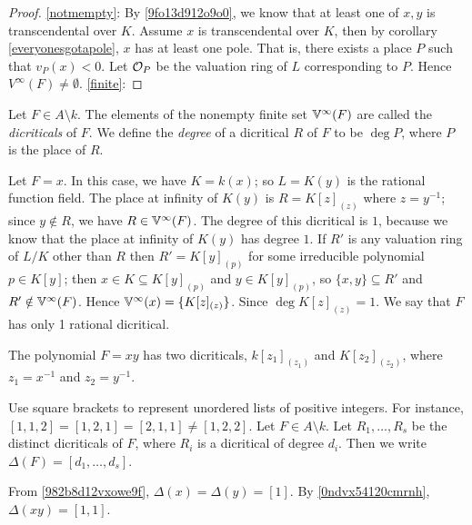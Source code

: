 \begin{proof}
	\eqref{notmempty}: By \ref{9fo13d912o9o0}, 
	we know that at least one of $x,y$ is transcendental 
	over $K$. Assume $x$ is transcendental over $K$, then by 
	corollary \ref{everyonesgotapole}, $x$ has at least one pole. 
	That is, there exists 
	a place $P$ such that $v_P(x)<0$. Let $\mathcal{O}_P$ be 
	the valuation ring of $L$ corresponding to $P$. Hence $V^{\infty}(F) \neq \emptyset$. 
	\eqref{finite}:
\end{proof}

\begin{definition}
	Let $F \in A \setminus  k$.
	The elements of the nonempty finite set $\mathbb{V}^\infty(F)$ are called the {\it dicriticals\/} of $F$.
	We define the {\it degree\/} of a dicritical $R$ of $F$ to be $\deg P$, where
	$P$ is the place of $R$.
\end{definition}

\begin{example} \label {982b8d12vxowe9f}
	Let $F=x$. In this case, we have $K= k(x)$; 
	so $L=K(y)$ is the rational function field.
	The place at infinity of $K(y)$ is $R = K[ z ]_{(z)}$ where $z = y^{-1}$;
	since $y \notin R$, we have $R \in \mathbb{V}^\infty(F)$.  
	The degree of this dicritical is $1$,
	because we know that the place at infinity of $K(y)$ has degree $1$.
	If $R'$ is any valuation ring of $L/K$ other than $R$
	then $R' = K[y]_{(p)}$ for some irreducible polynomial $p \in K[y]$;
	then $x \in K \subseteq K[y]_{(p)}$ and $y \in K[y]_{(p)}$, 
	so $\{x,y\} \subseteq R'$ and $R' \notin  \mathbb{V}^\infty(F)$.
	Hence  $\mathbb{V}^\infty(x) = \lbrace K[z]_{(z)} \rbrace$. Since 
	$\deg K[z]_{(z)} = 1$. We say that $F$ has only 1 rational 
	dicritical. 
\end{example}

\begin{example} \label {0ndvx54120cmrnh}
	The polynomial $F=xy$ has two dicriticals, $k[z_1]_{(z_1)}$ 
	and $K[z_2]_{(z_2)}$, where $z_1=x^{-1}$ and $z_2=y^{-1}$. 
\end{example}


\begin{definition}
	Use square brackets to represent unordered lists of positive integers.
	For instance, $[1,1,2] = [1,2,1] = [2,1,1] \neq [1,2,2]$. Let $F \in A \setminus  k$.
	Let $R_1, \dots, R_s$ be the distinct dicriticals of $F$, where $R_i$ is a dicritical of degree $d_i$.
	Then we write $\Delta(F) = [ d_1, \dots, d_s ]$.
\end{definition}

\begin{examples}
	From \ref{982b8d12vxowe9f}, $\Delta(x) = \Delta(y) = [1]$.
	By \ref{0ndvx54120cmrnh}, $\Delta(xy)=[1,1]$.
\end{examples}

